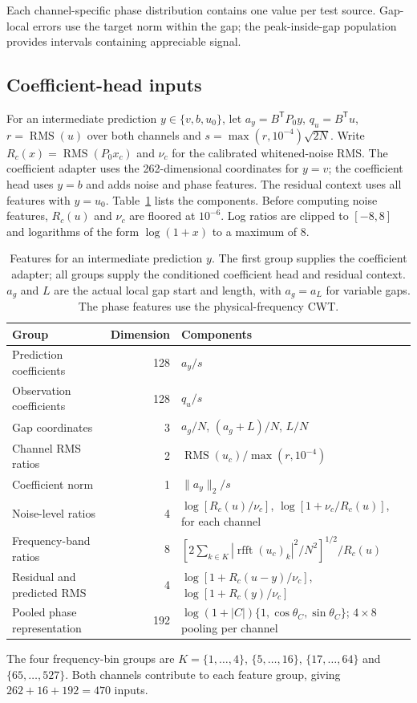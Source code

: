 \documentclass[10pt,prd,aps,a4paper,twocolumn,superscriptaddress,nofootinbib,floatfix]{revtex4-2}
\begin{document}
Each channel-specific phase distribution contains one value per test source. Gap-local errors use the target norm within the gap; the peak-inside-gap population provides intervals containing appreciable signal.


\subsection{Coefficient-head inputs}
For an intermediate prediction $y\in\{v,b,u_0\}$, let $a_y=B^{\mathsf T}P_0y$, $q_u=B^{\mathsf T}u$, $r=\operatorname{RMS}(u)$ over both channels and $s=\max(r,10^{-4})\sqrt{2N}$. Write $R_c(x)=\operatorname{RMS}(P_0x_c)$ and $\nu_c$ for the calibrated whitened-noise RMS. The coefficient adapter uses the 262-dimensional coordinates for $y=v$; the coefficient head uses $y=b$ and adds noise and phase features. The residual context uses all features with $y=u_0$. Table~\ref{tab:head_features} lists the components. Before computing noise features, $R_c(u)$ and $\nu_c$ are floored at $10^{-6}$. Log ratios are clipped to $[-8,8]$ and logarithms of the form $\log(1+x)$ to a maximum of 8.

\begin{table}[t]\centering
\caption{Features for an intermediate prediction $y$. The first group supplies the coefficient adapter; all groups supply the conditioned coefficient head and residual context. $a_g$ and $L$ are the actual local gap start and length, with $a_g=a_L$ for variable gaps. The phase features use the physical-frequency CWT.}\label{tab:head_features}
\begin{tabular}{lrl}\hline\hline
Group & Dimension & Components\\\hline
Prediction coefficients & 128 & $a_y/s$\\
Observation coefficients & 128 & $q_u/s$\\
Gap coordinates & 3 & $a_g/N$, $(a_g+L)/N$, $L/N$\\
Channel RMS ratios & 2 & $\operatorname{RMS}(u_c)/\max(r,10^{-4})$\\
Coefficient norm & 1 & $\|a_y\|_2/s$\\\hline
Noise-level ratios & 4 & $\log[R_c(u)/\nu_c]$, $\log[1+\nu_c/R_c(u)]$, for each channel\\
Frequency-band ratios & 8 & $[2\sum_{k\in K}|\operatorname{rfft}(u_c)_k|^2/N^2]^{1/2}/R_c(u)$\\
Residual and predicted RMS & 4 & $\log[1+R_c(u-y)/\nu_c]$, $\log[1+R_c(y)/\nu_c]$\\\hline
Pooled phase representation & 192 & $\log(1+|C|)\{1,\cos\theta_C,\sin\theta_C\}$; $4\times8$ pooling per channel\\
\hline\hline\end{tabular}

\smallskip\parbox{0.96\textwidth}{The four frequency-bin groups are $K=\{1,\ldots,4\}$, $\{5,\ldots,16\}$, $\{17,\ldots,64\}$ and $\{65,\ldots,527\}$. Both channels contribute to each feature group, giving $262+16+192=470$ inputs.}
\end{table}
\end{document}
